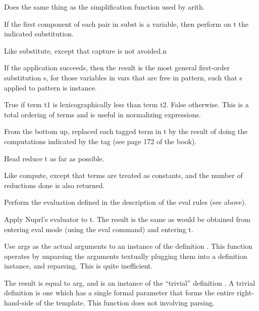   Does the same thing as the simplification
function used by arith.

  If the first
component of each pair in subst is a variable, then perform on t the
indicated substitution.

  Like substitute, except
that capture is not avoided.n

  If the application succeeds, then the result is the most
general first-order substitution s, for those variables in vars that are
free in pattern, such that s applied to pattern is instance.

 True if term t1 is
lexicographically less than term t2. False otherwise.  This is a total
ordering of terms and is useful in normalizing expressions.

  From the bottom up, replaced each
tagged term in t by the result of doing the computations indicated by
the tag (see page 172 of the book).

  Head reduce t as far as possible.

  Like compute, except that
 terms are treated as constants, and the number of reductions
done is also returned.

  Perform the evaluation
defined in the description of the eval rules (see above).

  Apply Nuprl's evaluator to t.  The result is
the same as would be obtained from entering eval mode (using the eval
command) and entering t.

  Use args as the
actual arguments to an instance of the definition .  This
function operates by unparsing the arguments textually plugging them
into a definition instance, and reparsing.  This is quite inefficient.

  The result is
equal to arg, and is an instance of the ``trivial'' definition .
A trivial definition is one which has a single formal parameter that
forms the entire right-hand-side of the template.  This function does
not involving parsing.

